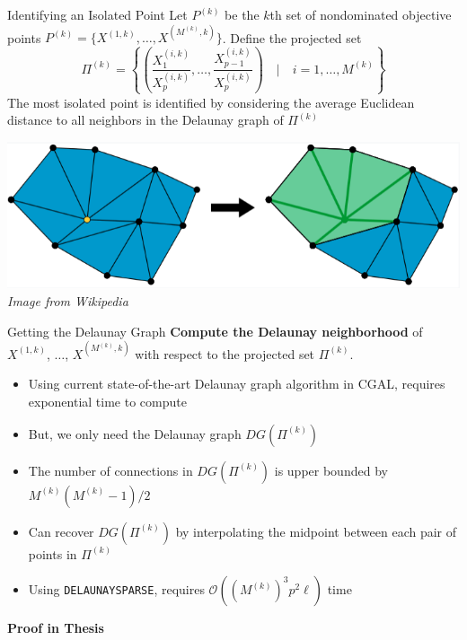 \documentclass[xcolor=dvipsnames]{beamer}
\begin{document}
\begin{frame}{Identifying an Isolated Point}
Let $P^{(k)}$ be the $k$th set of nondominated objective points
$P^{(k)} = \{X^{(1,k)}, \ldots, X^{(M^{(k)},k)}\} $.
\medskip
Define the projected set 
$$
\Pi^{(k)} = \left\{ \left(\frac{X^{(i,k)}_1}{X^{(i,k)}_p}, \ldots,
\frac{X^{(i,k)}_{p-1}}{X^{(i,k)}_p}\right) \quad\bigg|\quad
i = 1, \ldots, M^{(k)}\right\}
$$
The most isolated point is identified by considering the average
Euclidean distance to all neighbors in the Delaunay graph of $\Pi^{(k)}$\\
\begin{center}
\includegraphics[width=.5\textwidth]{del-nbhd.png}\\
{\it Image from Wikipedia}
\end{center}
\end{frame}
\begin{frame}{Getting the Delaunay Graph}
\textbf{Compute the Delaunay neighborhood} of $X^{(1,k)}$, $\ldots$,
$X^{(M^{(k)},k)}$ with respect to the projected set $\Pi^{(k)}$.\\
\medskip
\begin{itemize}
\item Using current state-of-the-art Delaunay graph algorithm in CGAL,
requires exponential time to compute
\item But, we only need the Delaunay graph $DG(\Pi^{(k)})$
\item The number of connections in $DG(\Pi^{(k)})$ is upper bounded by
$M^{(k)}(M^{(k)}-1)/2$
\item Can recover $DG(\Pi^{(k)})$ by interpolating the midpoint between each
pair of points in $\Pi^{(k)}$
\item Using {\tt DELAUNAYSPARSE}, requires
$\mathcal{O}((M^{(k)})^3 p^2 \ell)$ time
\end{itemize}
\smallskip
\centerline{\bf Proof in Thesis}
\end{frame}
\end{document}
